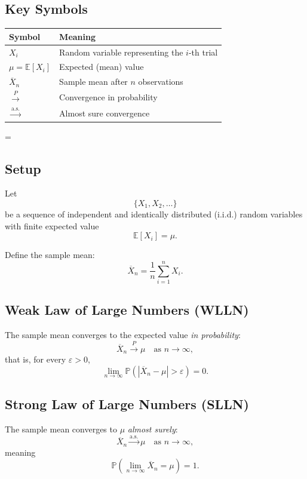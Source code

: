 \subsection*{Key Symbols}

\begin{center}
\begin{tabular}{ll}
\toprule
\textbf{Symbol} & \textbf{Meaning} \\
\midrule
$X_i$ & Random variable representing the $i$-th trial \\
$\mu = \mathbb{E}[X_i]$ & Expected (mean) value \\
$\overline{X}_n$ & Sample mean after $n$ observations \\
$\xrightarrow{P}$ & Convergence in probability \\
$\xrightarrow{\text{a.s.}}$ & Almost sure convergence \\
\bottomrule
\end{tabular}
\end{center}=

\subsection*{Setup}

Let
\[
\{X_1, X_2, \dots\}
\]
be a sequence of independent and identically distributed (i.i.d.) random variables with finite expected value
\[
\mathbb{E}[X_i] = \mu.
\]

Define the sample mean:
\[
\overline{X}_n = \frac{1}{n} \sum_{i=1}^{n} X_i.
\]

\subsection*{Weak Law of Large Numbers (WLLN)}

The sample mean converges to the expected value \emph{in probability}:
\[
\overline{X}_n \xrightarrow{P} \mu \quad \text{as } n \to \infty,
\]
that is, for every $\varepsilon > 0$,
\[
\lim_{n \to \infty} \mathbb{P}(|\overline{X}_n - \mu| > \varepsilon) = 0.
\]

\subsection*{Strong Law of Large Numbers (SLLN)}

The sample mean converges to $\mu$ \emph{almost surely}:
\[
\overline{X}_n \xrightarrow{\text{a.s.}} \mu \quad \text{as } n \to \infty,
\]
meaning
\[
\mathbb{P}\left( \lim_{n \to \infty} \overline{X}_n = \mu \right) = 1.
\]

